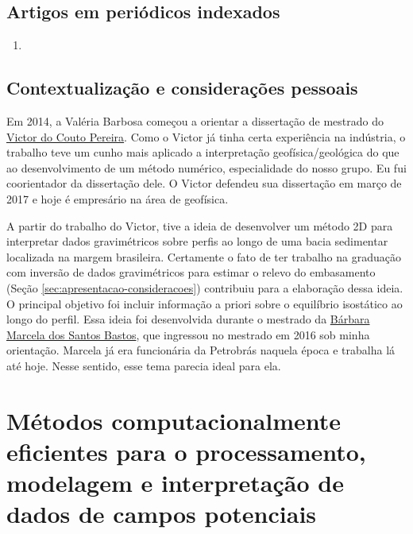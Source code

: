 \subsection*{Artigos em periódicos indexados}

\begin{enumerate}
	\item {}
\end{enumerate}

\subsection*{Contextualização e considerações pessoais}

Em 2014, a Valéria Barbosa começou a orientar a dissertação de mestrado do
\href{https://lattes.cnpq.br/5615324764745474}{Victor do Couto Pereira}. Como o Victor
já tinha certa experiência na indústria, o trabalho teve um cunho mais aplicado a
interpretação geofísica/geológica do que ao desenvolvimento de um método numérico,
especialidade do nosso grupo. Eu fui coorientador da dissertação dele.
O Victor defendeu sua dissertação em março de 2017 e hoje é empresário na
área de geofísica.

A partir do trabalho do Victor, tive a ideia de desenvolver um método 2D para interpretar
dados gravimétricos sobre perfis ao longo de uma bacia sedimentar localizada na margem
brasileira. Certamente o fato de ter trabalho na graduação com inversão de dados
gravimétricos para estimar o relevo do embasamento 
(Seção \ref{sec:apresentacao-consideracoes}) contribuiu para a elaboração dessa ideia.
O principal objetivo foi incluir informação a priori sobre o equilíbrio isostático
ao longo do perfil. Essa ideia foi desenvolvida durante o mestrado da 
\href{https://lattes.cnpq.br/8080347874698745}{Bárbara Marcela dos Santos Bastos},
que ingressou no mestrado em 2016 sob minha orientação. 
Marcela já era funcionária da Petrobrás naquela época e trabalha
lá até hoje. Nesse sentido, esse tema parecia ideal para ela.

\section{Métodos computacionalmente eficientes para o processamento, modelagem e interpretação de dados de campos potenciais} \label{sec:projeto-guarda-chuva-fast}

